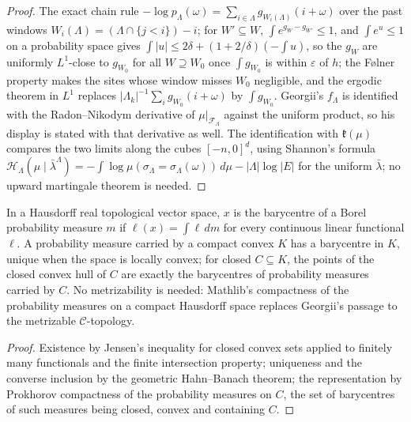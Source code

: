 \begin{proof}
    \leanok
    The exact chain rule $-\log p_\Lambda(\omega) = \sum_{i \in \Lambda} g_{W_i(\Lambda)}(i +
    \omega)$ over the past windows $W_i(\Lambda) = (\Lambda \cap \{j < i\}) - i$; for $W' \subseteq
    W$, $\int e^{g_W - g_{W'}} \leq 1$, and $\int e^u \leq 1$ on a probability space gives
    $\int|u| \leq 2\delta + (1 + 2/\delta)(-\int u)$, so the $g_W$ are uniformly $L^1$-close to
    $g_{W_0}$ for all $W \supseteq W_0$ once $\int g_{W_0}$ is within $\varepsilon$ of $h$;
    the F\o lner property makes the sites whose window misses $W_0$ negligible, and the ergodic
    theorem in $L^1$ replaces $|\Lambda_k|^{-1}\sum_i g_{W_0}(i + \omega)$ by $\int g_{W_0}$.
    Georgii's $f_\Lambda$ is identified with the Radon--Nikodym derivative of $\mu|_{\mathcal F_\Lambda}$
    against the uniform product, so his display is stated with that derivative as well.
    The identification with $\mathfrak k(\mu)$ compares the two limits along the cubes
    $[-n,0]^d$, using Shannon's formula $\mathcal H_\Lambda(\mu \mid \bar\lambda^\Lambda) =
    -\int \log \mu(\sigma_\Lambda = \sigma_\Lambda(\omega))\,d\mu - |\Lambda|\log|E|$
    for the uniform $\bar\lambda$; no upward martingale theorem is needed.
\end{proof}

\begin{theorem}
    \label{thm:ld-barycenter}
    \leanok

    In a Hausdorff real topological vector space, $x$ is the barycentre of a Borel probability
    measure $m$ if $\ell(x) = \int \ell\,dm$ for every continuous linear functional $\ell$. A
    probability measure carried by a compact convex $K$ has a barycentre in $K$, unique when the
    space is locally convex; for closed $C \subseteq K$, the points of the closed convex hull of
    $C$ are exactly the barycentres of probability measures carried by $C$. No metrizability is
    needed: Mathlib's compactness of the probability measures on a compact Hausdorff space
    replaces Georgii's passage to the metrizable $\mathcal C$-topology.
\end{theorem}
\begin{proof}
    \leanok
    Existence by Jensen's inequality for closed convex sets applied to finitely many functionals
    and the finite intersection property; uniqueness and the converse inclusion by the geometric
    Hahn--Banach theorem; the representation by Prokhorov compactness of the probability measures
    on $C$, the set of barycentres of such measures being closed, convex and containing $C$.
\end{proof}

